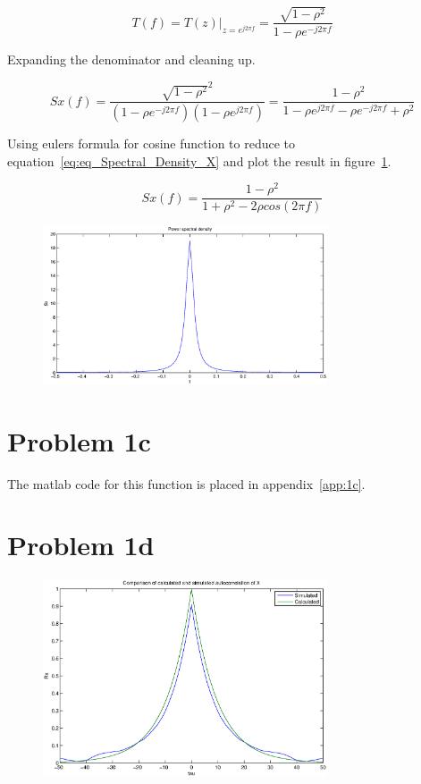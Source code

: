 	\begin{equation*}[H]
		T(f)=T(z)|_{z=e^{j2\pi f}}=\frac{\sqrt{1-\rho ^2}}{1-\rho e^{-j2\pi f}}
	\end{equation*}
	
	Expanding the denominator and cleaning up.
	
	\begin{equation*}[H]
		Sx(f)=\frac{\sqrt{1-\rho ^2}^2}{(1-\rho e^{-j2\pi f})(1-\rho e^{j2\pi f})}=\frac{1-\rho ^2}{1-\rho e^{j2\pi f}-\rho e^{-j2\pi f}+\rho ^2}
	\end{equation*}
	
	Using eulers formula for cosine function to reduce to equation~\ref{eq:eq_Spectral_Density_X} and plot the result in figure~\ref{fig:power_spectral_density_x}.
	
	\begin{equation}[H]
		Sx(f)=\frac{1-\rho ^2}{1+\rho ^2-2\rho cos(2\pi f)}
		\label{eq:eq_Spectral_Density_X}
	\end{equation}
	
	\begin{figure}[H]
	  \centering
	  \includegraphics[width=0.75\textwidth]{img/Oppgave1b}
	  \label{fig:power_spectral_density_x}
	\end{figure}
  
  \section{Problem 1c}
	The matlab code for this function is placed in appendix~\ref{app:1c}.
	
  
  \section{Problem 1d}
	
	\begin{figure}[h]
	  \centering
	  \includegraphics[width=0.75\textwidth]{img/Oppgave1d}
	  \label{fig:oppave1d}
	\end{figure}
	

